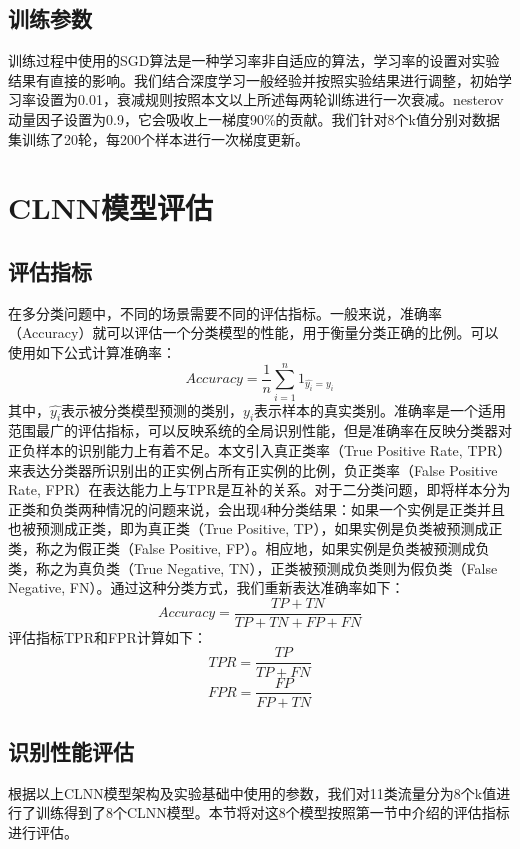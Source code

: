 \subsection{训练参数}
训练过程中使用的SGD算法是一种学习率非自适应的算法，学习率的设置对实验结果有直接的影响。我们结合深度学习一般经验并按照实验结果进行调整，初始学习率设置为0.01，衰减规则按照本文以上所述每两轮训练进行一次衰减。nesterov动量因子设置为0.9，它会吸收上一梯度90\%的贡献。我们针对8个k值分别对数据集训练了20轮，每200个样本进行一次梯度更新。


\section{CLNN模型评估}
\subsection{评估指标}
在多分类问题中，不同的场景需要不同的评估指标。一般来说，准确率（Accuracy）就可以评估一个分类模型的性能，用于衡量分类正确的比例。可以使用如下公式计算准确率：
\begin{equation}
Accuracy = \frac{1}{n} \sum\limits_{i = 1}^n {1_{\hat{y_i}={y_i}}}
\end{equation}
其中，$\hat{y_i}$表示被分类模型预测的类别，${y_i}$表示样本的真实类别。准确率是一个适用范围最广的评估指标，可以反映系统的全局识别性能，但是准确率在反映分类器对正负样本的识别能力上有着不足。本文引入真正类率（True Positive Rate, TPR）来表达分类器所识别出的正实例占所有正实例的比例，负正类率（False Positive Rate, FPR）在表达能力上与TPR是互补的关系。对于二分类问题，即将样本分为正类和负类两种情况的问题来说，会出现4种分类结果：如果一个实例是正类并且也被预测成正类，即为真正类（True Positive, TP），如果实例是负类被预测成正类，称之为假正类（False Positive, FP）。相应地，如果实例是负类被预测成负类，称之为真负类（True Negative, TN），正类被预测成负类则为假负类（False Negative, FN）。通过这种分类方式，我们重新表达准确率如下：
\begin{equation}
Accuracy = \frac{{TP + TN}}{{TP + TN + FP + FN}} 
\end{equation}
评估指标TPR和FPR计算如下：
\begin{equation}
TPR = \frac{{TP}}{{TP + FN}}
\end{equation}
\begin{equation}
FPR = \frac{{FP}}{{FP + TN}}
\end{equation}
\subsection{识别性能评估}
根据以上CLNN模型架构及实验基础中使用的参数，我们对11类流量分为8个k值进行了训练得到了8个CLNN模型。本节将对这8个模型按照第一节中介绍的评估指标进行评估。

